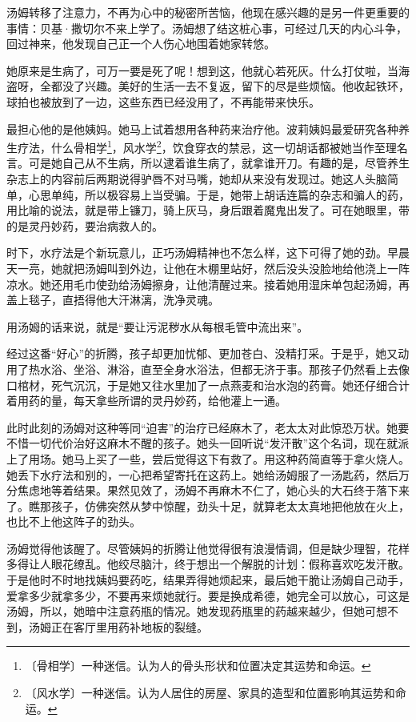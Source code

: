 \documentclass[12pt,UTF-8,openany]{ctexbook}
\begin{document}
\begin{large}
    
    汤姆转移了注意力，不再为心中的秘密所苦恼，他现在感兴趣的是另一件更重要的事情：贝基·撒切尔不来上学了。汤姆想了结这桩心事，可经过几天的内心斗争，回过神来，他发现自己正一个人伤心地围着她家转悠。
    
    她原来是生病了，可万一要是死了呢！想到这，他就心若死灰。什么打仗啦，当海盗呀，全都没了兴趣。美好的生活一去不复返，留下的尽是些烦恼。他收起铁环，球拍也被放到了一边，这些东西已经没用了，不再能带来快乐。
    
    最担心他的是他姨妈。她马上试着想用各种药来治疗他。波莉姨妈最爱研究各种养生疗法，什么骨相学\footnote{〔骨相学〕一种迷信。认为人的骨头形状和位置决定其运势和命运。}，风水学\footnote{〔风水学〕一种迷信。认为人居住的房屋、家具的造型和位置影响其运势和命运。}，饮食穿衣的禁忌，这一切胡话都被她当作至理名言。可是她自己从不生病，所以逮着谁生病了，就拿谁开刀。有趣的是，尽管养生杂志上的内容前后两期说得驴唇不对马嘴，她却从来没有发现过。她这人头脑简单，心思单纯，所以极容易上当受骗。于是，她带上胡话连篇的杂志和骗人的药，用比喻的说法，就是带上镰刀，骑上灰马，身后跟着魔鬼出发了。可在她眼里，带的是灵丹妙药，要治病救人的。
    
    时下，水疗法是个新玩意儿，正巧汤姆精神也不怎么样，这下可得了她的劲。早晨天一亮，她就把汤姆叫到外边，让他在木棚里站好，然后没头没脸地给他浇上一阵凉水。她还用毛巾使劲给汤姆擦身，让他清醒过来。接着她用湿床单包起汤姆，再盖上毯子，直捂得他大汗淋漓，洗净灵魂。
    
    用汤姆的话来说，就是“要让污泥秽水从每根毛管中流出来”。
    
    经过这番“好心”的折腾，孩子却更加忧郁、更加苍白、没精打采。于是乎，她又动用了热水浴、坐浴、淋浴，直至全身水浴法，但都无济于事。那孩子仍然看上去像口棺材，死气沉沉，于是她又往水里加了一点燕麦和治水泡的药膏。她还仔细合计着用药的量，每天拿些所谓的灵丹妙药，给他灌上一通。
    
    此时此刻的汤姆对这种等同“迫害”的治疗已经麻木了，老太太对此惊恐万状。她要不惜一切代价治好这麻木不醒的孩子。她头一回听说“发汗散”这个名词，现在就派上了用场。她马上买了一些，尝后觉得这下有救了。用这种药简直等于拿火烧人。她丢下水疗法和别的，一心把希望寄托在这药上。她给汤姆服了一汤匙药，然后万分焦虑地等着结果。果然见效了，汤姆不再麻木不仁了，她心头的大石终于落下来了。瞧那孩子，仿佛突然从梦中惊醒，劲头十足，就算老太太真地把他放在火上，也比不上他这阵子的劲头。
    
    汤姆觉得他该醒了。尽管姨妈的折腾让他觉得很有浪漫情调，但是缺少理智，花样多得让人眼花缭乱。他绞尽脑汁，终于想出一个解脱的计划：假称喜欢吃发汗散。于是他时不时地找姨妈要药吃，结果弄得她烦起来，最后她干脆让汤姆自己动手，爱拿多少就拿多少，不要再来烦她就行。要是换成希德，她完全可以放心，可这是汤姆，所以，她暗中注意药瓶的情况。她发现药瓶里的药越来越少，但她可想不到，汤姆正在客厅里用药补地板的裂缝。
    

\end{large}
\end{document}
